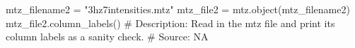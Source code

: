 mtz_filename2 = "3hz7intensities.mtz"
mtz_file2 = mtz.object(mtz_filename2)
mtz_file2.column_labels()                                                                                        
# Description:  Read in the mtz file and print its column labels as a sanity check.
# Source:  NA

